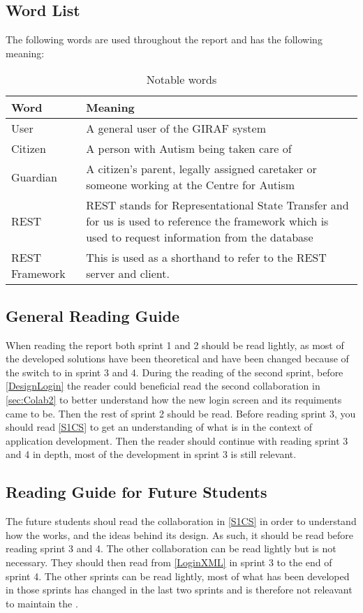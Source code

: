 \subsection{Word List}
The following words are used throughout the report and has the following
meaning:

\begin{table}[H]
\centering

\begin{tabular}{|l|p{6cm}|}
\hline
\textbf{Word} & \textbf{Meaning} \\ \hline
User & A general user of the GIRAF system \\ \hline
Citizen & A person with Autism being taken care of \\ \hline
Guardian & A citizen's parent, legally assigned caretaker or someone working
at the Centre for Autism\\ \hline
REST &  REST stands for Representational State Transfer and for us is used to
reference the framework which is used to request information from the database\\\hline
REST Framework & This is used as a shorthand to refer to the REST server and
client.\\\hline
\end{tabular}
\caption{Notable words}
\end{table}

\subsection{General Reading Guide}
When reading the report both sprint 1 and 2 should be read lightly, as most of
the developed solutions have been theoretical and have been changed because of
the switch to  in sprint 3 and 4. During the reading of the second
sprint, before \autoref{DesignLogin} the reader could beneficial read the second
collaboration in \autoref{sec:Colab2} to better understand how the new login screen and its requiments
came to be. Then the rest of sprint 2 should be read. Before reading sprint 3, you should read
\autoref{S1CS} to get an understanding of what  is in
the context of application development. Then the reader should continue with
reading sprint 3 and 4 in depth, most of the development in sprint 3 is still
relevant.

\subsection{Reading Guide for Future Students}
The future students shoul read the collaboration in \autoref{S1CS} in order to
understand how the  works, and the ideas behind its
design. As such, it should be read before reading sprint 3 and 4. The other
collaboration can be read lightly but is not necessary. They should then read
from \autoref{LoginXML} in sprint 3 to the end of sprint 4. The other sprints
can be read lightly, most of what has been developed in those sprints has
changed in the last two sprints and is therefore not releavant to maintain the
.